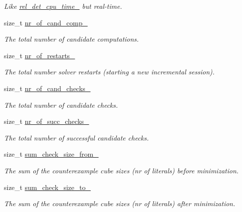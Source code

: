 \begin{DoxyCompactItemize}
\begin{DoxyCompactList}\small\item\em Like \hyperlink{classLearnStatisticsSAT_aa7d1ca100b6ad0500931ca80d1439f28}{rel\-\_\-det\-\_\-cpu\-\_\-time\-\_\-} but real-\/time. \end{DoxyCompactList}\item 
size\-\_\-t \hyperlink{classLearnStatisticsSAT_a02de895c31e4c58396d5f07154e21561}{nr\-\_\-of\-\_\-cand\-\_\-comp\-\_\-}
\begin{DoxyCompactList}\small\item\em The total number of candidate computations. \end{DoxyCompactList}\item 
size\-\_\-t \hyperlink{classLearnStatisticsSAT_a07c8eee4a3c82762e3a94e38440f3adb}{nr\-\_\-of\-\_\-restarts\-\_\-}
\begin{DoxyCompactList}\small\item\em The total number solver restarts (starting a new incremental session). \end{DoxyCompactList}\item 
size\-\_\-t \hyperlink{classLearnStatisticsSAT_a1c3b6dff92cbcec06c944606c3555b64}{nr\-\_\-of\-\_\-cand\-\_\-checks\-\_\-}
\begin{DoxyCompactList}\small\item\em The total number of candidate checks. \end{DoxyCompactList}\item 
size\-\_\-t \hyperlink{classLearnStatisticsSAT_aa059a13f6afcf98a04be072aa5ce3f1d}{nr\-\_\-of\-\_\-succ\-\_\-checks\-\_\-}
\begin{DoxyCompactList}\small\item\em The total number of successful candidate checks. \end{DoxyCompactList}\item 
size\-\_\-t \hyperlink{classLearnStatisticsSAT_a2d6735aa7c84c50967b3bb779d2a0a86}{sum\-\_\-check\-\_\-size\-\_\-from\-\_\-}
\begin{DoxyCompactList}\small\item\em The sum of the counterexample cube sizes (nr of literals) before minimization. \end{DoxyCompactList}\item 
size\-\_\-t \hyperlink{classLearnStatisticsSAT_ae805d5a2fc2f724d325136a9f30e6b4b}{sum\-\_\-check\-\_\-size\-\_\-to\-\_\-}
\begin{DoxyCompactList}\small\item\em The sum of the counterexample cube sizes (nr of literals) after minimization. \end{DoxyCompactList}\item 

\end{DoxyCompactItemize}
